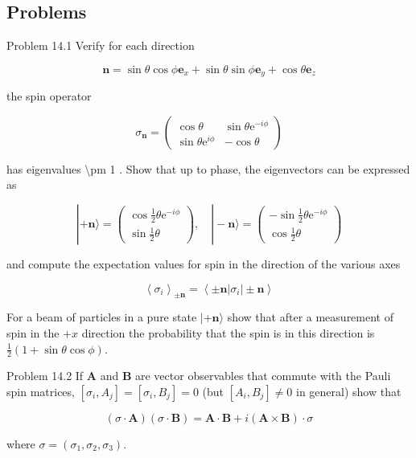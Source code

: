 \documentclass[10pt]{article}
\begin{document}
\subsection*{Problems}
Problem 14.1 Verify for each direction

$$
\mathbf{n}=\sin \theta \cos \phi \mathbf{e}_{x}+\sin \theta \sin \phi \mathbf{e}_{y}+\cos \theta \mathbf{e}_{z}
$$

the spin operator

$$
\sigma_{\mathbf{n}}=\left(\begin{array}{cc}
\cos \theta & \sin \theta \mathrm{e}^{-i \phi} \\
\sin \theta \mathrm{e}^{i \phi} & -\cos \theta
\end{array}\right)
$$

has eigenvalues \textbackslash pm 1 . Show that up to phase, the eigenvectors can be expressed as

$$
|+\mathbf{n}\rangle=\left(\begin{array}{c}
\cos \frac{1}{2} \theta \mathrm{e}^{-i \phi} \\
\sin \frac{1}{2} \theta
\end{array}\right), \quad|-\mathbf{n}\rangle=\left(\begin{array}{c}
-\sin \frac{1}{2} \theta \mathrm{e}^{-i \phi} \\
\cos \frac{1}{2} \theta
\end{array}\right)
$$

and compute the expectation values for spin in the direction of the various axes

$$
\left\langle\sigma_{i}\right\rangle_{ \pm \mathbf{n}}=\left\langle \pm \mathbf{n}\left|\sigma_{i}\right| \pm \mathbf{n}\right\rangle
$$

For a beam of particles in a pure state $|+\mathbf{n}\rangle$ show that after a measurement of spin in the $+x$ direction the probability that the spin is in this direction is $\frac{1}{2}(1+\sin \theta \cos \phi)$.

Problem 14.2 If $\mathbf{A}$ and $\mathbf{B}$ are vector observables that commute with the Pauli spin matrices, $\left[\sigma_{i}, A_{j}\right]=\left[\sigma_{i}, B_{j}\right]=0$ (but $\left[A_{i}, B_{j}\right] \neq 0$ in general) show that

$$
(\sigma \cdot \mathbf{A})(\sigma \cdot \mathbf{B})=\mathbf{A} \cdot \mathbf{B}+i(\mathbf{A} \times \mathbf{B}) \cdot \sigma
$$

where $\sigma=\left(\sigma_{1}, \sigma_{2}, \sigma_{3}\right)$.
\end{document}
